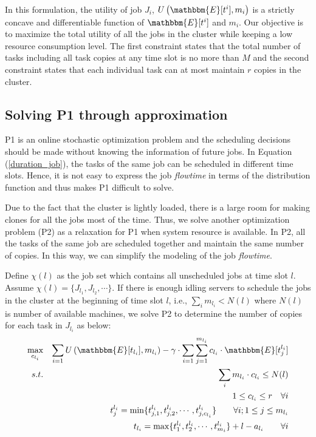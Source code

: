 \documentclass[10pt,conference]{IEEEtran}
\begin{document}
In this formulation, the utility of job $J_i$, $U\left( \mathbbm{E}[t^i],m_i\right)$ is a strictly concave  and differentiable function of $ \mathbbm{E}[t^i]$  and $m_i$. Our objective is to maximize the total utility of all the jobs in the cluster while keeping a low resource consumption level. The first constraint states that the total number of  tasks including all task copies at any time slot is no more than $M$ and the second constraint states that each individual task can at most maintain $r$ copies in the cluster.

\subsection{Solving P1 through approximation}
\label{p1_solve}
P1 is an online stochastic optimization problem and the scheduling decisions should be made without knowing the information of future jobs. In Equation (\ref{duration_job}), the tasks of the same job can be scheduled in different time slots. Hence, it is not easy to express the job \textit{flowtime} in terms of the distribution function and thus makes P1 difficult to solve.

Due to the fact that the cluster is lightly loaded, there is a large room for making clones for all the jobs most of the time. Thus, we solve another optimization problem (P2) as a relaxation for P1 when system resource is available. In P2, all the tasks of the same job are scheduled together and maintain the same number of copies. In this way, we can simplify the modeling of the job \textit{flowtime}.

Define $\chi(l)$ as the job set which contains all unscheduled jobs at time slot $l$. Assume $\chi(l) =  \{J_{l_1}, J_{l_2}, \cdots\}$. If there is enough idling servers to schedule the jobs in the cluster at the beginning of time slot $l$, i.e., $\sum_{i}m_{l_i} < N(l)$ where $N(l)$ is number of available machines, we solve P2 to determine the number of copies for each task in $J_{l_i}$ as below:
\begin{eqnarray*}
\max_{c_{l_i}}  &  &  \sum_{i = 1} U\left( \mathbbm{E}[t_{l_i}],m_{l_i}\right) - \gamma\cdot \sum_{i=1} \sum_{j=1}^{m_{l_i}}c_{l_i}\cdot \mathbbm{E}[t^{l_i}_j]\\
 s.t. &  & \sum_{i}m_{l_i}\cdot c_{l_i} \leq N(l) \\
  &  &  1 \leq c_{l_i} \leq r \quad \forall  i\\
  & & t^{l_i}_j =  \min\{t^{l_i}_{j,1}, t^{l_i}_{j,2}, \cdots, t^{l_i}_{j,c_{l_i}}\} \qquad \forall i; 1 \leq j \leq m_{l_i} \\
  & & t_{l_i} =  \max\{t^{l_i}_{1}, t^{l_i}_{2}, \cdots, t^{l_i}_{m_i}\}  + l - a_{l_i}\qquad   \forall i
\end{eqnarray*}
\end{document}
